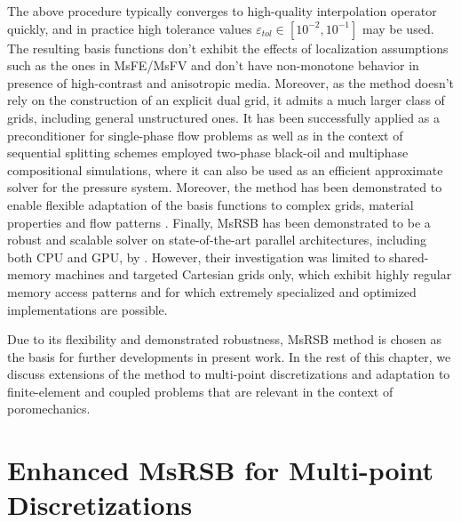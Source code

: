 The above procedure typically converges to high-quality interpolation operator quickly, and in practice high tolerance values $\varepsilon_{tol} \in [10^{-2}, 10^{-1}]$ may be used.   The resulting basis functions don't exhibit the effects of localization assumptions such as the ones in MsFE/MsFV and don't have non-monotone behavior in presence of high-contrast and anisotropic media.   Moreover, as the method doesn't rely on the construction of an explicit dual grid, it admits a much larger class of grids, including general unstructured ones.   It has been successfully applied as a preconditioner for single-phase flow problems \cite{Moyner2016} as well as in the context of sequential splitting schemes employed two-phase black-oil \cite{Moyner2016,Moyner2016a} and multiphase compositional \cite{Moyner2017} simulations, where it can also be used as an efficient approximate solver for the pressure system.   Moreover, the method has been demonstrated to enable flexible adaptation of the basis functions to complex grids, material properties and flow patterns \cite{Lie2017,Klemetsdal2020}.   Finally, MsRSB has been demonstrated to be a robust and scalable solver on state-of-the-art parallel architectures, including both CPU and GPU, by \cite{Manea2021,Manea2022}.   However, their investigation was limited to shared-memory machines and targeted Cartesian grids only, which exhibit highly regular memory access patterns and for which extremely specialized and optimized implementations are possible.

Due to its flexibility and demonstrated robustness, MsRSB method is chosen as the basis for further developments in present work.   In the rest of this chapter, we discuss extensions of the method to multi-point discretizations and adaptation to finite-element and coupled problems that are relevant in the context of poromechanics.

\section{Enhanced MsRSB for Multi-point Discretizations}
\label{sec:enhanced_msrsb}

